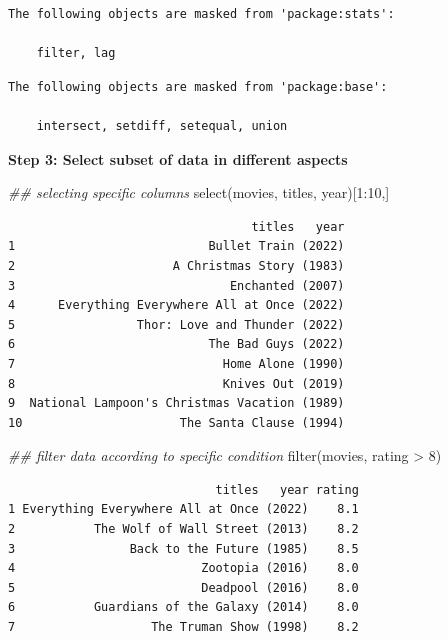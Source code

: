 \documentclass[
  letterpaper,
  DIV=11,
  numbers=noendperiod]{scrreprt}
\newenvironment{Shaded}{\begin{snugshade}}{\end{snugshade}}
\newcommand{\DecValTok}[1]{\textcolor[rgb]{0.68,0.00,0.00}{#1}}
\newcommand{\DocumentationTok}[1]{\textcolor[rgb]{0.37,0.37,0.37}{\textit{#1}}}
\newcommand{\FunctionTok}[1]{\textcolor[rgb]{0.28,0.35,0.67}{#1}}
\newcommand{\NormalTok}[1]{\textcolor[rgb]{0.00,0.23,0.31}{#1}}
\newcommand{\SpecialCharTok}[1]{\textcolor[rgb]{0.37,0.37,0.37}{#1}}
\begin{document}
\begin{verbatim}
The following objects are masked from 'package:stats':

    filter, lag
\end{verbatim}

\begin{verbatim}
The following objects are masked from 'package:base':

    intersect, setdiff, setequal, union
\end{verbatim}

\textbf{Step 3: Select subset of data in different aspects}

\begin{Shaded}
\begin{Highlighting}[]
\DocumentationTok{\#\# selecting specific columns}
\FunctionTok{select}\NormalTok{(movies, titles, year)[}\DecValTok{1}\SpecialCharTok{:}\DecValTok{10}\NormalTok{,]}
\end{Highlighting}
\end{Shaded}

\begin{verbatim}
                                  titles   year
1                           Bullet Train (2022)
2                      A Christmas Story (1983)
3                              Enchanted (2007)
4      Everything Everywhere All at Once (2022)
5                 Thor: Love and Thunder (2022)
6                           The Bad Guys (2022)
7                             Home Alone (1990)
8                             Knives Out (2019)
9  National Lampoon's Christmas Vacation (1989)
10                      The Santa Clause (1994)
\end{verbatim}

\begin{Shaded}
\begin{Highlighting}[]
\DocumentationTok{\#\# filter data according to specific condition}
\FunctionTok{filter}\NormalTok{(movies, rating }\SpecialCharTok{\textgreater{}} \DecValTok{8}\NormalTok{)}
\end{Highlighting}
\end{Shaded}

\begin{verbatim}
                             titles   year rating
1 Everything Everywhere All at Once (2022)    8.1
2           The Wolf of Wall Street (2013)    8.2
3                Back to the Future (1985)    8.5
4                          Zootopia (2016)    8.0
5                          Deadpool (2016)    8.0
6           Guardians of the Galaxy (2014)    8.0
7                   The Truman Show (1998)    8.2
\end{verbatim}
\end{document}
